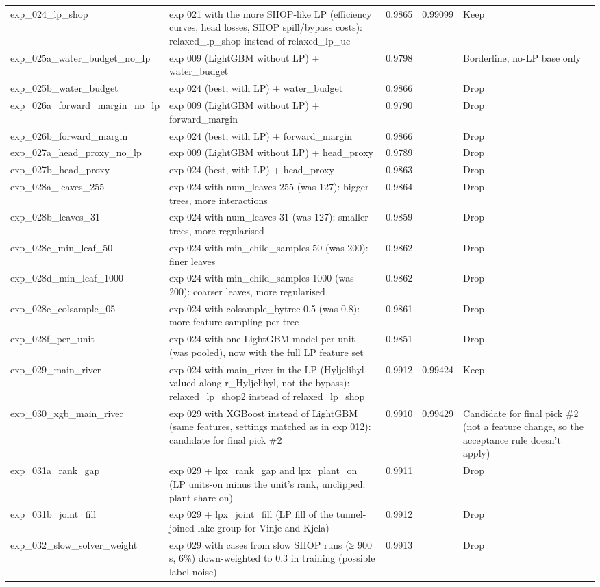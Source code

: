 \begin{longtable}{p{4.4cm}p{5.2cm}llp{2.4cm}}
exp\_024\_lp\_shop & exp 021 with the more SHOP-like LP (efficiency curves, head losses, SHOP spill/bypass costs): relaxed\_lp\_shop instead of relaxed\_lp\_uc & 0.9865 & 0.99099 & Keep \\
exp\_025a\_water\_budget\_no\_lp & exp 009 (LightGBM without LP) + water\_budget & 0.9798 &  & Borderline, no-LP base only \\
exp\_025b\_water\_budget & exp 024 (best, with LP) + water\_budget & 0.9866 &  & Drop \\
exp\_026a\_forward\_margin\_no\_lp & exp 009 (LightGBM without LP) + forward\_margin & 0.9790 &  & Drop \\
exp\_026b\_forward\_margin & exp 024 (best, with LP) + forward\_margin & 0.9866 &  & Drop \\
exp\_027a\_head\_proxy\_no\_lp & exp 009 (LightGBM without LP) + head\_proxy & 0.9789 &  & Drop \\
exp\_027b\_head\_proxy & exp 024 (best, with LP) + head\_proxy & 0.9863 &  & Drop \\
exp\_028a\_leaves\_255 & exp 024 with num\_leaves 255 (was 127): bigger trees, more interactions & 0.9864 &  & Drop \\
exp\_028b\_leaves\_31 & exp 024 with num\_leaves 31 (was 127): smaller trees, more regularised & 0.9859 &  & Drop \\
exp\_028c\_min\_leaf\_50 & exp 024 with min\_child\_samples 50 (was 200): finer leaves & 0.9862 &  & Drop \\
exp\_028d\_min\_leaf\_1000 & exp 024 with min\_child\_samples 1000 (was 200): coarser leaves, more regularised & 0.9862 &  & Drop \\
exp\_028e\_colsample\_05 & exp 024 with colsample\_bytree 0.5 (was 0.8): more feature sampling per tree & 0.9861 &  & Drop \\
exp\_028f\_per\_unit & exp 024 with one LightGBM model per unit (was pooled), now with the full LP feature set & 0.9851 &  & Drop \\
exp\_029\_main\_river & exp 024 with main\_river in the LP (Hyljelihyl valued along r\_Hyljelihyl, not the bypass): relaxed\_lp\_shop2 instead of relaxed\_lp\_shop & 0.9912 & 0.99424 & Keep \\
exp\_030\_xgb\_main\_river & exp 029 with XGBoost instead of LightGBM (same features, settings matched as in exp 012): candidate for final pick \#2 & 0.9910 & 0.99429 & Candidate for final pick \#2 (not a feature change, so the acceptance rule doesn't apply) \\
exp\_031a\_rank\_gap & exp 029 + lpx\_rank\_gap and lpx\_plant\_on (LP units-on minus the unit's rank, unclipped; plant share on) & 0.9911 &  & Drop \\
exp\_031b\_joint\_fill & exp 029 + lpx\_joint\_fill (LP fill of the tunnel-joined lake group for Vinje and Kjela) & 0.9912 &  & Drop \\
exp\_032\_slow\_solver\_weight & exp 029 with cases from slow SHOP runs (≥ 900 s, 6\%) down-weighted to 0.3 in training (possible label noise) & 0.9913 &  & Drop \\
\bottomrule
\end{longtable}
